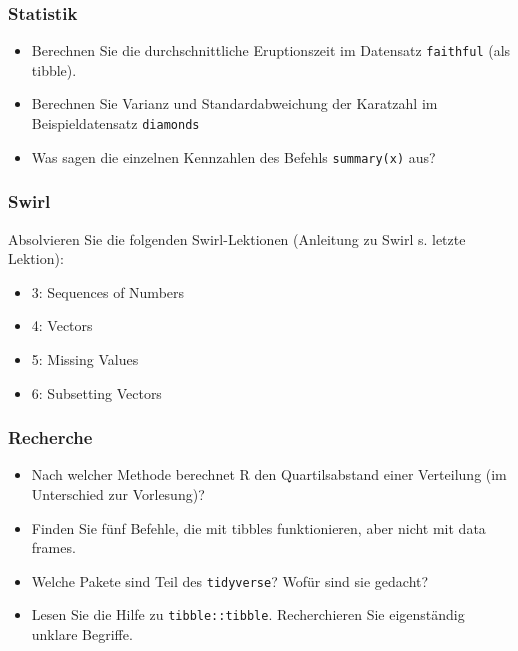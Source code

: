 \documentclass[
  ngerman,
]{article}
\providecommand{\tightlist}{%
  \setlength{\itemsep}{0pt}\setlength{\parskip}{0pt}}
\begin{document}
\hypertarget{statistik}{%
\subsubsection{Statistik}\label{statistik}}

\begin{itemize}
\tightlist
\item
  Berechnen Sie die durchschnittliche Eruptionszeit im Datensatz \texttt{faithful} (als tibble).
\item
  Berechnen Sie Varianz und Standardabweichung der Karatzahl im Beispieldatensatz \texttt{diamonds}
\item
  Was sagen die einzelnen Kennzahlen des Befehls \texttt{summary(x)} aus?
\end{itemize}

\hypertarget{swirl-1}{%
\subsubsection{Swirl}\label{swirl-1}}

Absolvieren Sie die folgenden Swirl-Lektionen (Anleitung zu Swirl s. letzte Lektion):

\begin{itemize}
\tightlist
\item
  3: Sequences of Numbers
\item
  4: Vectors
\item
  5: Missing Values
\item
  6: Subsetting Vectors
\end{itemize}

\hypertarget{recherche-1}{%
\subsubsection{Recherche}\label{recherche-1}}

\begin{itemize}
\tightlist
\item
  Nach welcher Methode berechnet R den Quartilsabstand einer Verteilung (im Unterschied zur Vorlesung)?
\item
  Finden Sie fünf Befehle, die mit tibbles funktionieren, aber nicht mit data frames.
\item
  Welche Pakete sind Teil des \texttt{tidyverse}? Wofür sind sie gedacht?
\item
  Lesen Sie die Hilfe zu \texttt{tibble::tibble}. Recherchieren Sie eigenständig unklare Begriffe.
\end{itemize}
\end{document}
